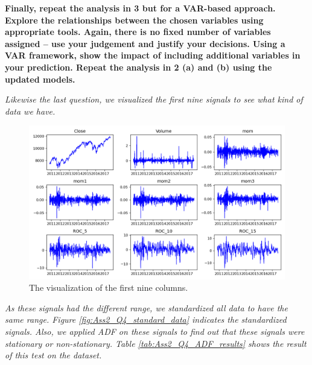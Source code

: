 \item \textbf{Finally, repeat the analysis in 3 but for a VAR-based approach. Explore the relationships between the chosen variables using appropriate tools. Again, there is no fixed number of variables assigned – use your judgement and justify your decisions.  Using a VAR framework, show the impact of including additional variables in your prediction. Repeat the analysis in 2 (a) and (b) using the updated models.} 

\textit{Likewise the last question, we visualized the first nine signals to see what kind of data we have.} 

\begin{figure}[H]
    \centering
    \begin{minipage}[b]{1\textwidth}
        \includegraphics[width=\textwidth]{figures/Ass2/Ass2_Q3_raw_signal.png}
    \end{minipage}
    \caption{The visualization of the first nine columns.}
    \label{fig:Ass2_Q4_raw_signal}
\end{figure}




\textit{As these signals had the different range, we  standardized all data to have the same range. Figure \ref{fig:Ass2_Q4_standard_data} indicates the standardized signals. Also, we applied \gls{ADF} on these signals to find out that these signals were stationary or non-stationary. Table \ref{tab:Ass2_Q4_ADF_results} shows the result of this test on the dataset.}


